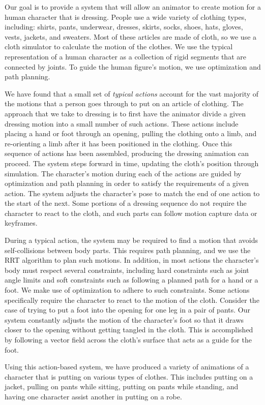 Our goal is to provide a system that will allow an animator to create
motion for a human character that is dressing.  People use a wide variety
of clothing types, including: shirts, pants, underwear, dresses, skirts,
socks, shoes, hats, gloves, vests, jackets, and sweaters.  Most of these
articles are made of cloth, so we use a cloth simulator to calculate the
motion of the clothes.  We use the typical representation of a human
character as a collection of rigid segments that are connected by joints.
To guide the human figure's motion, we use optimization and path planning.

We have found that a small set of \emph{typical actions} account for the vast
majority of the motions that a person goes through to put on an article of
clothing.  The approach that we take to dressing is to first have the
animator divide a given dressing motion into a small number of such
actions.  These actions include placing a hand or foot through an opening,
pulling the clothing onto a limb, and re-orienting a limb after it has
been positioned in the clothing.  Once this sequence of actions has been
assembled, producing the dressing animation can proceed.  The system steps
forward in time, updating the cloth's position through simulation.  The
character's motion during each of the actions are guided by optimization
and path planning in order to satisfy the requirements of a given
action.  The system adjusts the character's pose to match the end of one
action to the start of the next.  Some portions of a dressing sequence do
not require the character to react to the cloth, and such parts can follow
motion capture data or keyframes.

During a typical action, the system may be required to find a motion that
avoids self-collisions between body parts.  This requires path planning,
and we use the RRT algorithm to plan such motions.  In addition, in most
actions the character's body must respect several constraints, including
hard constraints such as joint angle limits and soft constraints such as
following a planned path for a hand or a foot.  We make use of
optimization to adhere to such constraints.  Some actions specifically
require the character to react to the motion of the cloth.  Consider the
case of trying to put a foot into the opening for one leg in a pair of
pants.  Our system constantly adjusts the motion of the character's foot
so that it draws closer to the opening without getting tangled in the
cloth.  This is accomplished by following a vector field across the
cloth's surface that acts as a guide for the foot.

Using this action-based system, we have produced a variety of animations
of a character that is putting on various types of clothes.  This includes
putting on a jacket, pulling on pants while sitting, putting on pants
while standing, and having one character assist another in putting on a
robe.


